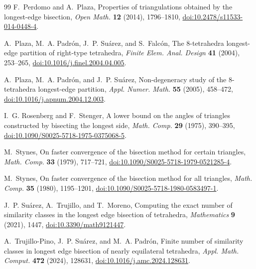 \documentclass[10pt]{article}
\theoremstyle{definition}
\begin{document}
\begin{thebibliography}{99}
F.~Perdomo and A.~Plaza,
\newblock Properties of triangulations obtained by the longest-edge bisection,
\newblock \emph{Open Math.} \textbf{12} (2014), 1796--1810,
\newblock \href{https://doi.org/10.2478/s11533-014-0448-4}{doi:10.2478/s11533-014-0448-4}.

A.~Plaza, M.~A. Padr\'on, J.~P. Su\'arez, and S.~Falc\'on,
\newblock The 8-tetrahedra longest-edge partition of right-type tetrahedra,
\newblock \emph{Finite Elem. Anal. Design} \textbf{41} (2004), 253--265,
\newblock \href{https://doi.org/10.1016/j.finel.2004.04.005}{doi:10.1016/j.finel.2004.04.005}.

A.~Plaza, M.~A. Padr\'on, and J.~P. Su\'arez,
\newblock Non-degeneracy study of the 8-tetrahedra longest-edge partition,
\newblock \emph{Appl. Numer. Math.} \textbf{55} (2005), 458--472,
\newblock \href{https://doi.org/10.1016/j.apnum.2004.12.003}{doi:10.1016/j.apnum.2004.12.003}.


I.~G. Rosenberg and F.~Stenger,
\newblock A lower bound on the angles of triangles constructed by bisecting the longest side,
\newblock \emph{Math. Comp.} \textbf{29} (1975), 390--395,
\newblock \href{https://doi.org/10.1090/S0025-5718-1975-0375068-5}{doi:10.1090/S0025-5718-1975-0375068-5}.

M.~Stynes,
\newblock On faster convergence of the bisection method for certain triangles,
\newblock \emph{Math. Comp.} \textbf{33} (1979), 717--721,
\newblock \href{https://doi.org/10.1090/S0025-5718-1979-0521285-4}{doi:10.1090/S0025-5718-1979-0521285-4}.

M.~Stynes,
\newblock On faster convergence of the bisection method for all triangles,
\newblock \emph{Math. Comp.} \textbf{35} (1980), 1195--1201,
\newblock \href{https://doi.org/10.1090/S0025-5718-1980-0583497-1}{doi:10.1090/S0025-5718-1980-0583497-1}.

J.~P. Su\'arez, A.~Trujillo, and T.~Moreno,
\newblock Computing the exact number of similarity classes in the longest edge bisection of tetrahedra,
\newblock \emph{Mathematics} \textbf{9} (2021), 1447,
\newblock \href{https://doi.org/10.3390/math9121447}{doi:10.3390/math9121447}.

A.~Trujillo-Pino, J.~P. Su\'arez, and M.~A. Padr\'on,
\newblock Finite number of similarity classes in longest edge bisection of nearly equilateral tetrahedra,
\newblock \emph{Appl. Math. Comput.} \textbf{472} (2024), 128631,
\newblock \href{https://doi.org/10.1016/j.amc.2024.128631}{doi:10.1016/j.amc.2024.128631}.

\end{thebibliography}
\end{document}
